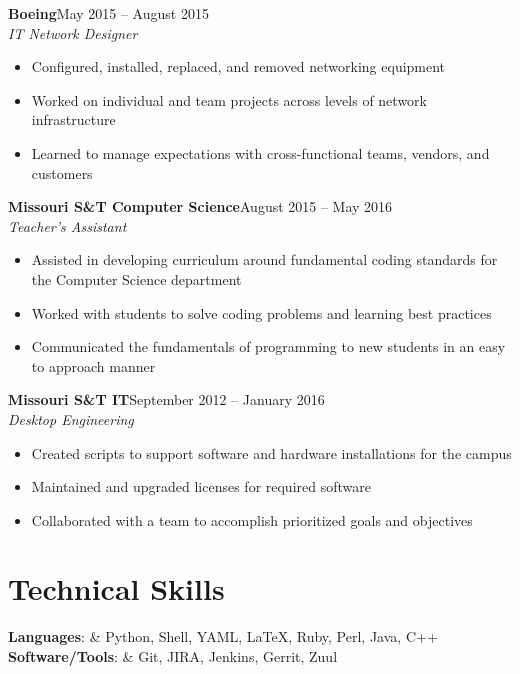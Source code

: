 \documentclass[margin]{res}
\begin{document}
   \textbf{Boeing}\hfill May 2015 -- August 2015 \\
   \textit{IT Network Designer}\hfill 
   \begin{itemize} \itemsep -1pt  %
     \item Configured, installed, replaced, and removed networking equipment
     \item Worked on individual and team projects across levels of network infrastructure
     \item Learned to manage expectations with cross-functional teams, vendors, and customers
   \end{itemize}

   \textbf{Missouri S\&T Computer Science}\hfill August 2015 -- May 2016\\
   \textit{Teacher's Assistant} 
   \begin{itemize} \itemsep -1pt  %
     \item Assisted in developing curriculum around fundamental coding standards for the Computer Science department
     \item Worked with students to solve coding problems and learning best practices
     \item Communicated the fundamentals of programming to new students in an easy to approach manner
   \end{itemize}

	   \textbf{Missouri S\&T IT}\hfill September 2012 -- January 2016\\
   \textit{Desktop Engineering}\hfill
   \begin{itemize} \itemsep -1pt  %
     \item Created scripts to support software and hardware installations for the campus
     \item Maintained and upgraded licenses for required software
     \item Collaborated with a team to accomplish prioritized goals and objectives
   \end{itemize}
   
\section{Technical Skills}
    \textbf{Languages}: & Python, Shell, YAML, \LaTeX, Ruby, Perl, Java, C++ \\
    \textbf{Software/Tools}: & Git, JIRA, Jenkins, Gerrit, Zuul
\end{document}
